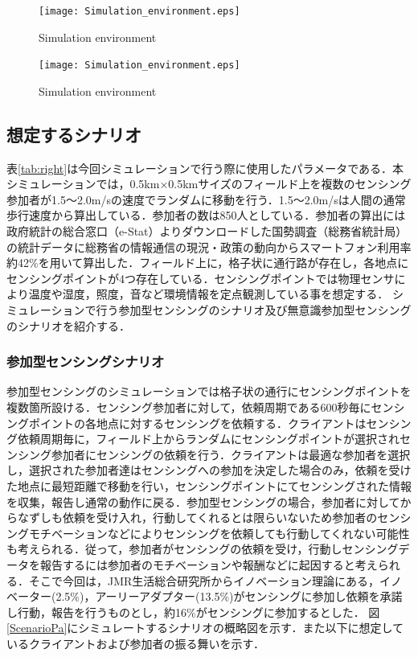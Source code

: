 \documentclass[submit,techrep]{ipsj}
\begin{document}
\begin{figure}[b]
 \begin{center}
  \texttt{[image: Simulation\_environment.eps]}
 \end{center}
 \caption{Simulation environment}
 \label{SimulationE}
\end{figure}

\begin{figure}[tb]
 \begin{center}
  \texttt{[image: Simulation\_environment.eps]}
 \end{center}
\caption{Simulation environment}
\label{fig:double}
\end{figure}
\fi

\subsection{想定するシナリオ}
表\ref{tab:right}は今回シミュレーションで行う際に使用したパラメータである．本シミュレーションでは，0.5km×0.5kmサイズのフィールド上を複数のセンシング参加者が1.5〜2.0m/sの速度でランダムに移動を行う．1.5〜2.0m/sは人間の通常歩行速度から算出している．参加者の数は850人としている．参加者の算出には政府統計の総合窓口（e-Stat）\cite{eStat}よりダウンロードした国勢調査（総務省統計局）の統計データに総務省の情報通信の現況・政策の動向からスマートフォン利用率約42\%\cite{General}を用いて算出した．フィールド上に，格子状に通行路が存在し，各地点にセンシングポイントが4つ存在している．センシングポイントでは物理センサにより温度や湿度，照度，音など環境情報を定点観測している事を想定する．
シミュレーションで行う参加型センシングのシナリオ及び無意識参加型センシングのシナリオを紹介する．

\subsubsection{参加型センシングシナリオ}
参加型センシングのシミュレーションでは格子状の通行にセンシングポイントを複数箇所設ける．センシング参加者に対して，依頼周期である600秒毎にセンシングポイントの各地点に対するセンシングを依頼する．クライアントはセンシング依頼周期毎に，フィールド上からランダムにセンシングポイントが選択されセンシング参加者にセンシングの依頼を行う．クライアントは最適な参加者を選択し，選択された参加者達はセンシングへの参加を決定した場合のみ，依頼を受けた地点に最短距離で移動を行い，センシングポイントにてセンシングされた情報を収集，報告し通常の動作に戻る．参加型センシングの場合，参加者に対してからなずしも依頼を受け入れ，行動してくれるとは限らいないため参加者のセンシングモチベーションなどによりセンシングを依頼しても行動してくれない可能性も考えられる．従って，参加者がセンシングの依頼を受け，行動しセンシングデータを報告するには参加者のモチベーションや報酬などに起因すると考えられる．そこで今回は，JMR生活総合研究所\cite{JMR}からイノベーション理論にある，イノベーター(2.5\%)，アーリーアダプター(13.5\%)がセンシングに参加し依頼を承諾し行動，報告を行うものとし，約16\%がセンシングに参加するとした．%
図\ref{ScenarioPa}にシミュレートするシナリオの概略図を示す．また以下に想定しているクライアントおよび参加者の振る舞いを示す．\\
\end{document}
